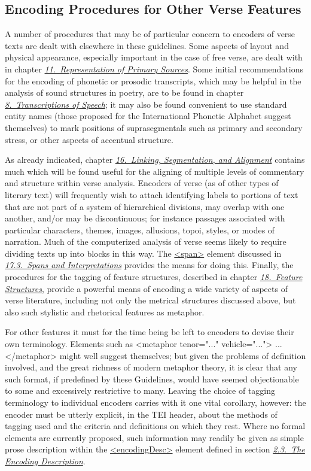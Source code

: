 \subsection[{Encoding Procedures for Other Verse Features}]{Encoding Procedures for Other Verse Features}\label{VEETC}\par
A number of procedures that may be of particular concern to encoders of verse texts are dealt with elsewhere in these guidelines. Some aspects of layout and physical appearance, especially important in the case of free verse, are dealt with in chapter \textit{\hyperref[PH]{11.\ Representation of Primary Sources}}. Some initial recommendations for the encoding of phonetic or prosodic transcripts, which may be helpful in the analysis of sound structures in poetry, are to be found in chapter \textit{\hyperref[TS]{8.\ Transcriptions of Speech}}; it may also be found convenient to use standard entity names (those proposed for the International Phonetic Alphabet suggest themselves) to mark positions of suprasegmentals such as primary and secondary stress, or other aspects of accentual structure.\par
As already indicated, chapter \textit{\hyperref[SA]{16.\ Linking, Segmentation, and Alignment}} contains much which will be found useful for the aligning of multiple levels of commentary and structure within verse analysis. Encoders of verse (as of other types of literary text) will frequently wish to attach identifying labels to portions of text that are not part of a system of hierarchical divisions, may overlap with one another, and/or may be discontinuous; for instance passages associated with particular characters, themes, images, allusions, topoi, styles, or modes of narration. Much of the computerized analysis of verse seems likely to require dividing texts up into blocks in this way. The \hyperref[TEI.span]{<span>} element discussed in \textit{\hyperref[AISP]{17.3.\ Spans and Interpretations}} provides the means for doing this. Finally, the procedures for the tagging of feature structures, described in chapter \textit{\hyperref[FS]{18.\ Feature Structures}}, provide a powerful means of encoding a wide variety of aspects of verse literature, including not only the metrical structures discussed above, but also such stylistic and rhetorical features as metaphor.\par
For other features it must for the time being be left to encoders to devise their own terminology. Elements such as <metaphor tenor="..." vehicle="..."> ... </metaphor> might well suggest themselves; but given the problems of definition involved, and the great richness of modern metaphor theory, it is clear that any such format, if predefined by these Guidelines, would have seemed objectionable to some and excessively restrictive to many. Leaving the choice of tagging terminology to individual encoders carries with it one vital corollary, however: the encoder must be utterly explicit, in the TEI header, about the methods of tagging used and the criteria and definitions on which they rest. Where no formal elements are currently proposed, such information may readily be given as simple prose description within the \hyperref[TEI.encodingDesc]{<encodingDesc>} element defined in section \textit{\hyperref[HD5]{2.3.\ The Encoding Description}}.

